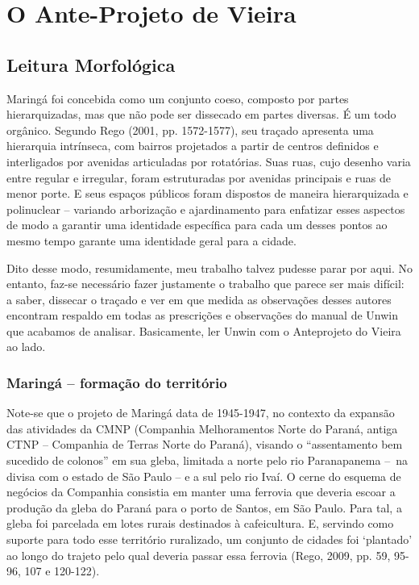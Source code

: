 \documentclass[12pt, a4paper]{book} %
\begin{document}
        \chapter[O Ante-Projeto de Vieira]{O Ante-Projeto de Vieira}

            \section{Leitura Morfológica}

        Maringá foi concebida como um conjunto coeso, composto por partes hierarquizadas, mas que não pode ser dissecado em partes diversas. É um todo orgânico. Segundo Rego (2001, pp. 1572-1577), seu traçado apresenta uma hierarquia intrínseca, com bairros projetados a partir de centros definidos e interligados por avenidas articuladas por rotatórias. Suas ruas, cujo desenho varia entre regular e irregular, foram estruturadas por avenidas principais e ruas de menor porte. E seus espaços públicos foram dispostos de maneira hierarquizada e polinuclear – variando arborização e ajardinamento para enfatizar esses aspectos de modo a garantir uma identidade específica para cada um desses pontos ao mesmo tempo garante uma identidade geral para a cidade.

        Dito desse modo, resumidamente, meu trabalho talvez pudesse parar por aqui. No entanto, faz-se necessário fazer justamente o trabalho que parece ser mais difícil: a saber, dissecar o traçado e ver em que medida as observações desses autores encontram respaldo em todas as prescrições e observações do manual de Unwin que acabamos de analisar. Basicamente, ler Unwin com o Anteprojeto do Vieira ao lado.

                \subsection*{Maringá – formação do território}

        Note-se que o projeto de Maringá data de 1945-1947, no contexto da expansão das atividades da CMNP (Companhia Melhoramentos Norte do Paraná, antiga CTNP – Companhia de Terras Norte do Paraná), visando o ``assentamento bem sucedido de colonos'' em sua gleba, limitada a norte pelo rio Paranapanema – na divisa com o estado de São Paulo – e a sul pelo rio Ivaí. O cerne do esquema de negócios da Companhia consistia em manter uma ferrovia que deveria escoar a produção da gleba do Paraná para o porto de Santos, em São Paulo. Para tal, a gleba foi parcelada em lotes rurais destinados à cafeicultura. E, servindo como suporte para todo esse território ruralizado, um conjunto de cidades foi `plantado' ao longo do trajeto pelo qual deveria passar essa ferrovia (Rego, 2009, pp. 59, 95-96, 107 e 120-122). 
\end{document}
